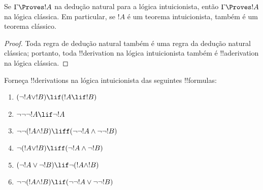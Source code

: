 \documentclass[../../../include/open-logic-section]{subfiles}
\begin{document}
\begin{prop}
  Se $\Gamma \Proves !A$ na dedução natural para a lógica
  intuicionista, então $\Gamma \Proves !A$ na lógica clássica. Em
  particular, se $!A$ é um teorema intuicionista, também é um teorema
  clássico.
\end{prop}

\begin{proof}
  Toda regra de dedução natural também é uma regra da dedução natural
  clássica; portanto, toda !!{derivation} na lógica intuicionista também
  é !!a{derivation} na lógica clássica.
\end{proof}

\begin{prob}
  Forneça !!{derivation}s na lógica intuicionista das seguintes !!{formula}s:
  \begin{enumerate}
    \item $(\lnot !A \lor !B) \lif (!A \lif !B)$
    \item $\lnot\lnot\lnot !A \lif \lnot !A$
    \item $\lnot\lnot (!A \land !B) \liff (\lnot\lnot !A\land \lnot \lnot !B)$
    \item $\lnot (!A \lor !B) \liff (\lnot !A \land \lnot !B)$
    \item $(\lnot !A \lor \lnot !B) \lif \lnot (!A \land !B)$
    \item $\lnot\lnot ( !A \land !B) \lif  (\lnot\lnot !A \lor
    \lnot\lnot !B)$
  \end{enumerate}
\end{prob}
\end{document}

